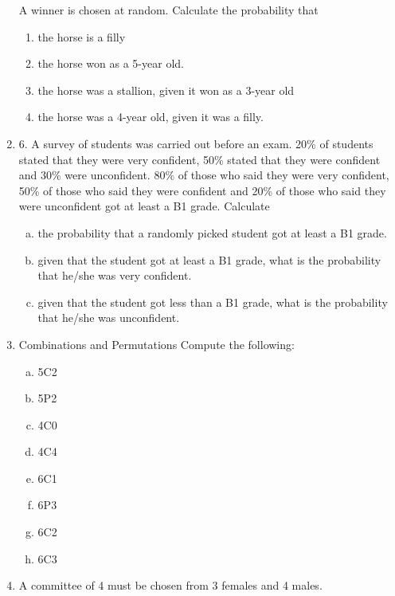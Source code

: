 \documentclass[a4paper,12pt]{article}
\begin{document}
\begin{enumerate}
A winner is chosen at random. Calculate the probability that

\begin{enumerate}
	\item the horse is a filly
	\item the horse won as a 5-year old.
	\item the horse was a stallion, given it won as a 3-year old
	\item the horse was a 4-year old, given it was a filly.
\end{enumerate}

\item 	6. A survey of students was carried out before an exam. 20\% of students stated that they were very confident, 50\% stated that they were confident and 30\% were unconfident. 80\% of those who said they were very confident, 50\% of those who said they were confident and 20\% of those who said they were unconfident got at least a B1 grade. Calculate 
\begin{enumerate}[(a)]
	\item 	the probability that a randomly picked student  got at least a B1 grade.
\item	given that the student got at least a B1 grade, what is the probability that he/she was very confident.
\item	given that the student got less than a B1 grade, what is the probability that he/she was unconfident.

\end{enumerate}

\item 
Combinations and Permutations Compute the following:

\begin{multicols}{2}
\begin{enumerate}[(a)] 
	\item	5C2
	\item	5P2
	\item	4C0
	\item	4C4
	\item	6C1
	\item	6P3
	\item	6C2
	\item	6C3
\end{enumerate}

\end{multicols}

\item A committee of 4 must be chosen from 3 females and 4 males.


\end{enumerate}
\end{document}
